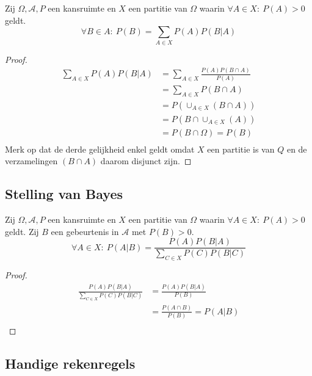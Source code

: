 \documentclass[main.tex]{subfiles}
\begin{document}
\begin{st}
  Zij $\Omega,\mathcal{A},P$ een kansruimte en $X$ een partitie van $\Omega$ waarin $\forall A \in X:\ P(A) > 0$ geldt.
  \[ \forall B \in A:\ P(B) = \sum_{A\in X}P(A)P(B|A) \]
  \begin{proof}
    \[
    \begin{array}{rl}
      \sum_{A\in X}P(A)P(B|A)
      &= \sum_{A\in X}\frac{P(A)P(B \cap A)}{P(A)}\\
      &= \sum_{A\in X} P(B \cap A)\\
      &= P(\cup_{A\in X}(B \cap A))\\
      &= P(B \cap \cup_{A\in X}(A))\\
      &= P(B \cap \Omega) = P(B)\\
    \end{array}
    \]
    Merk op dat de derde gelijkheid enkel geldt omdat $X$ een partitie is van $Q$ en de verzamelingen $(B \cap A)$ daarom disjunct zijn.
  \end{proof}
\end{st}

\subsection{Stelling van Bayes}
\label{sec:stelling-van-bayes}

\begin{st}
  \label{st:bayes}
  Zij $\Omega,\mathcal{A},P$ een kansruimte en $X$ een partitie van $\Omega$ waarin $\forall A \in X:\ P(A) > 0$ geldt.
  Zij $B$ een gebeurtenis in $\mathcal{A}$ met $P(B) > 0$.
  \[ \forall A\in X:\ P(A|B) = \frac{P(A)P(B|A)}{\sum_{C\in X}P(C)P(B|C)} \]
  \begin{proof}
    \[
      \begin{array}{rl}
        \frac{P(A)P(B|A)}{\sum_{C\in X}P(C)P(B|C)}
        &= \frac{P(A)P(B|A)}{P(B)}\\
        &= \frac{P(A \cap B)}{P(B)} = P(A|B)\\
      \end{array}
    \]
  \end{proof}
\end{st}

\subsection{Handige rekenregels}
\label{sec:handige-rekenregels}
\end{document}
